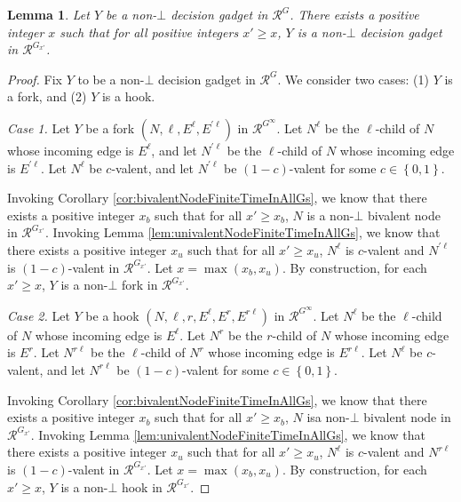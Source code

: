 \documentclass[11pt]{article}
\numberwithin{theorem}{section}
\newtheorem{lemma}[theorem]{Lemma}
\newcommand{\set}[1]{\left\{#1\right\}}
\begin{document}
\begin{lemma}\label{lem:decisionGadgetStableInAllGs}
Let $Y$ be a non-$\bot$ decision gadget in $\mathcal{R}^{G}$. There exists a positive integer $x$ such that for all positive integers $x' \geq x$, $Y$ is a non-$\bot$ decision gadget in $\mathcal{R}^{G_{x'}}$.
\end{lemma}
\begin{proof}
Fix $Y$ to be a non-$\bot$ decision gadget in $\mathcal{R}^{G}$. We consider two cases: (1) $Y$ is a fork, and (2) $Y$ is a hook.

\emph{Case 1.} Let $Y$ be a fork $(N,\ell,E^\ell,E^{\prime \ell})$ in $\mathcal{R}^{G^\infty}$. Let $N^\ell$ be the $\ell$-child of $N$ whose incoming edge is $E^\ell$, and let $N^{\prime \ell}$ be the $\ell$-child of $N$ whose incoming edge is $E^{\prime \ell}$. Let $N^\ell$ be $c$-valent, and let $N^{\prime \ell}$ be $(1-c)$-valent for some $c \in \set{0,1}$. 

Invoking Corollary \ref{cor:bivalentNodeFiniteTimeInAllGs}, we know that there exists a positive integer $x_b$ such that for all $x' \geq x_b$, $N$ is a non-$\bot$ bivalent node in $\mathcal{R}^{G_{x'}}$.
Invoking Lemma \ref{lem:univalentNodeFiniteTimeInAllGs}, we know that there exists a positive integer $x_u$ such that for all $x' \geq x_u$, $N^\ell$ is $c$-valent and  $N^{\prime \ell}$ is $(1-c)$-valent in $\mathcal{R}^{G_{x'}}$.
Let $x = \max(x_b,x_u)$. By construction, for each $x' \geq x$, $Y$ is a non-$\bot$ fork in $\mathcal{R}^{G_{x'}}$.

\emph{Case 2.} Let $Y$ be a hook $(N,\ell,r,E^\ell,E^r,E^{r \ell})$ in $\mathcal{R}^{G^\infty}$. Let $N^\ell$ be the $\ell$-child of $N$ whose incoming edge is $E^\ell$. Let $N^r$ be the $r$-child of $N$ whose incoming edge is $E^r$. Let $N^{r \ell}$ be the $\ell$-child of $N^r$ whose incoming edge is $E^{r \ell}$. Let $N^\ell$ be $c$-valent, and let $N^{r \ell}$ be $(1-c)$-valent for some $c \in \set{0,1}$. 

Invoking Corollary \ref{cor:bivalentNodeFiniteTimeInAllGs}, we know that there exists a positive integer $x_b$ such that for all $x' \geq x_b$, $N$ isa non-$\bot$  bivalent node in $\mathcal{R}^{G_{x'}}$. Invoking Lemma \ref{lem:univalentNodeFiniteTimeInAllGs}, we know that there exists a positive integer $x_u$ such that for all $x' \geq x_u$, $N^\ell$ is $c$-valent and  $N^{r \ell}$ is $(1-c)$-valent in $\mathcal{R}^{G_{x'}}$.
Let $x = \max(x_b,x_u)$. By construction, for each $x' \geq x$, $Y$ is a non-$\bot$ hook in $\mathcal{R}^{G_{x'}}$.
\end{proof}
\end{document}
